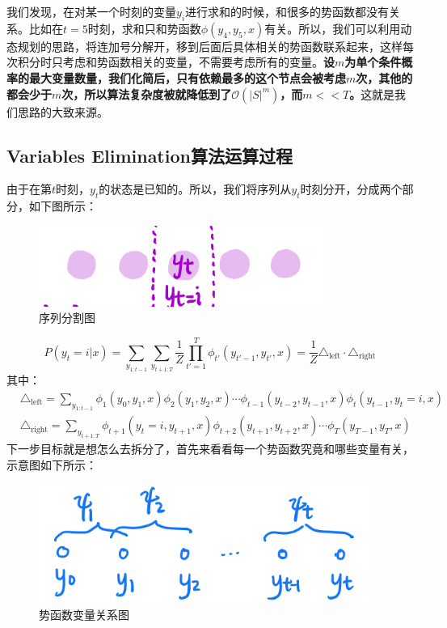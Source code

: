 \documentclass[a4paper]{article}
\begin{document}
我们发现，在对某一个时刻的变量$y_i$进行求和的时候，和很多的势函数都没有关系。比如在$t=5$时刻，求和只和势函数$\phi(y_4,y_5,x)$有关。所以，我们可以利用动态规划的思路，将连加号分解开，移到后面后具体相关的势函数联系起来，这样每次积分时只考虑和势函数相关的变量，不需要考虑所有的变量。\textbf{设$m$为单个条件概率的最大变量数量，我们化简后，只有依赖最多的这个节点会被考虑$m$次，其他的都会少于$m$次，所以算法复杂度被就降低到了$\mathcal{O}(|S|^m)$，而$m << T$。}这就是我们思路的大致来源。

\subsection{Variables Elimination算法运算过程}
由于在第$t$时刻，$y_t$的状态是已知的。所以，我们将序列从$y_t$时刻分开，分成两个部分，如下图所示：
\begin{figure}[H]
    \centering
    \includegraphics[width=.35\textwidth]{微信图片_20200224144010.png}
    \caption{序列分割图}
    \label{fig:my_label_1}
\end{figure}
\begin{equation}
    P(y_t=i|x) = \sum_{y_{1:t-1}} \sum_{y_{t+1:T}} \frac{1}{Z} \prod_{t'=1}^T \phi_{t'}(y_{t'-1},y_{t'},x) = \frac{1}{Z} \triangle_{\mathrm{left}}\cdot \triangle_{\mathrm{right}}
\end{equation}
其中：
\begin{equation}
\begin{split}
    & \triangle_{\mathrm{left}} = \sum_{y_{1:t-1}} \phi_1(y_0,y_1,x)\phi_2(y_1,y_2,x)\cdots\phi_{t-1}(y_{t-2},y_{t-1},x)\phi_{t}(y_{t-1},y_{t}=i,x) \\
    & \triangle_{\mathrm{right}} = \sum_{y_{t+1:T}} \phi_{t+1}(y_{t}=i,y_{t+1},x)\phi_{t+2}(y_{t+1},y_{t+2},x)\cdots\phi_{T}(y_{T-1},y_{T},x)
\end{split}
\end{equation}
下一步目标就是想怎么去拆分了，首先来看看每一个势函数究竟和哪些变量有关，示意图如下所示：
\begin{figure}[H]
    \centering
    \includegraphics[width=.35\textwidth]{微信图片_20200224165315.png}
    \caption{势函数变量关系图}
    \label{fig:my_label_1}
\end{figure}
\end{document}
